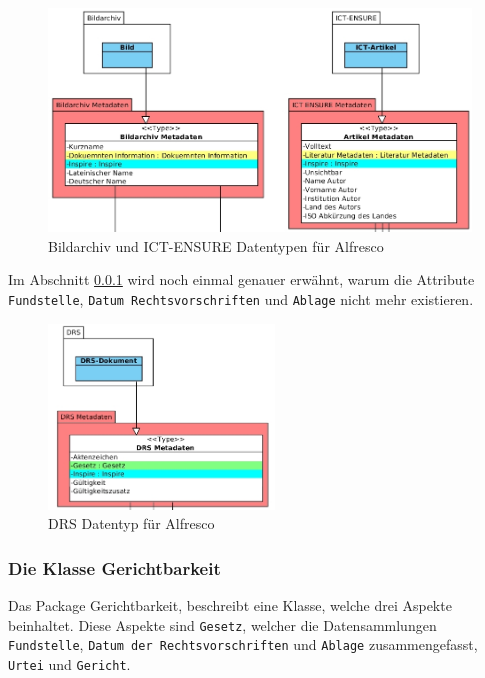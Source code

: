 \begin{figure}[!ht]
\centering
\includegraphics[width=12cm]{Bilder/AlfrescoModell/Bildarchiv-und-ICT-Datentypen.jpg}
\caption{Bildarchiv und ICT-ENSURE Datentypen f\"ur Alfresco}
\label{Bildarchiv und ICT-ENSURE Datentypen f\"ur Alfresco}
\centering
\end{figure}

Im Abschnitt \ref{Die Klasse Gerichtbarkeit} wird noch einmal genauer erw\"ahnt, warum die Attribute \texttt{Fundstelle}, \texttt{Datum Rechtsvorschriften} und \texttt{Ablage} nicht mehr existieren.

\begin{figure}[!ht]
\centering
\includegraphics[width=6cm]{Bilder/AlfrescoModell/DRS-Datentypen.jpg}
\caption{DRS Datentyp f\"ur Alfresco}
\label{DRS Datentyp f\"ur Alfresco}
\centering
\end{figure}

\FloatBarrier
\subsubsection{Die Klasse Gerichtbarkeit}\label{Die Klasse Gerichtbarkeit}
Das Package Gerichtbarkeit, beschreibt eine Klasse, welche drei Aspekte beinhaltet. Diese Aspekte sind \texttt{Gesetz}, welcher die Datensammlungen \texttt{Fundstelle}, \texttt{Datum der Rechtsvorschriften} und \texttt{Ablage} zusammengefasst, \texttt{Urtei} und \texttt{Gericht}. 

